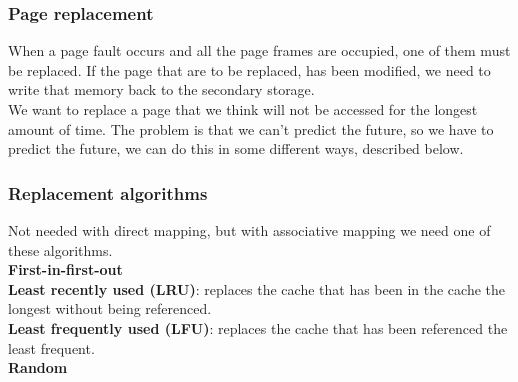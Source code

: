 \subsubsection{Page replacement}
When a page fault occurs and all the page frames are occupied, one of them must be replaced. If the page that are to be replaced, has been modified, we need to write that memory back to the secondary storage. \\

We want to replace a page that we think will not be accessed for the longest amount of time. The problem is that we can't predict the future, so we have to predict the future, we can do this in some different ways, described below.

\subsubsection{Replacement algorithms}
Not needed with direct mapping, but with associative mapping we need one of these algorithms. \\

\textbf{First-in-first-out} \\
\textbf{Least recently used (LRU)}: replaces the cache that has been in the cache the longest without being referenced.\\
\textbf{Least frequently used (LFU)}: replaces the cache that has been referenced the least frequent.\\ 
\textbf{Random}\\ 
